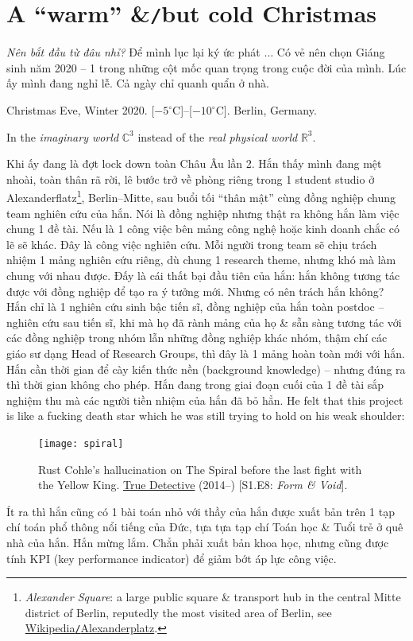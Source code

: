 \documentclass[12pt,twoside]{book}
\begin{document}
\section{A ``warm'' \&{\tt/}but cold Christmas}
{\it Nên bắt đầu từ đâu nhỉ?} Để mình lục lại ký ức phát $\ldots$ Có vẻ nên chọn Giáng sinh năm 2020 -- 1 trong những cột mốc quan trọng trong cuộc đời của mình. Lúc ấy mình đang nghỉ lễ. Cả ngày chỉ quanh quẩn ở nhà.
\begin{flushright}
	Christmas Eve, Winter 2020. [$-5^\circ$C]--[$-10^\circ$C]. Berlin, Germany.
	
	In the {\it imaginary world} $\mathbb{C}^3$ instead of the {\it real physical world} $\mathbb{R}^3$.
\end{flushright}
Khi ấy đang là đợt lock down toàn Châu Âu lần 2.
Hắn thấy mình đang mệt nhoài, toàn thân rã rời, lê bước trở về phòng riêng trong 1 student studio ở Alexanderflatz\footnote{ {\it Alexander Square}: a large public square \& transport hub in the central Mitte district of Berlin, reputedly the most visited area of Berlin, see \href{https://en.wikipedia.org/wiki/Alexanderplatz}{Wikipedia{\tt/}Alexanderplatz}.}, Berlin--Mitte, sau buổi tối ``thân mật'' cùng đồng nghiệp chung team nghiên cứu của hắn. Nói là đồng nghiệp nhưng thật ra không hắn làm việc chung 1 đề tài. Nếu là 1 công việc bên mảng công nghệ hoặc kinh doanh chắc có lẽ sẽ khác. Đây là công việc nghiên cứu. Mỗi người trong team sẽ chịu trách nhiệm 1 mảng nghiên cứu riêng, dù chung 1 research theme, nhưng khó mà làm chung với nhau được. Đấy là cái thất bại đầu tiên của hắn: hắn không tương tác được với đồng nghiệp để tạo ra ý tưởng mới. Nhưng có nên trách hắn không? Hắn chỉ là 1 nghiên cứu sinh bậc tiến sĩ, đồng nghiệp của hắn toàn postdoc -- nghiên cứu sau tiến sĩ, khi mà họ đã rành mảng của họ \& sẵn sàng tương tác với các đồng nghiệp trong nhóm lẫn những đồng nghiệp khác nhóm, thậm chí các giáo sư dạng Head of Research Groups, thì đây là 1 mảng hoàn toàn mới với hắn. Hắn cần thời gian để cày kiến thức nền (background knowledge) -- nhưng đúng ra thì thời gian không cho phép. Hắn đang trong giai đoạn cuối của 1 đề tài sắp nghiệm thu mà các người tiền nhiệm của hắn đã bỏ hẳn. He felt that this project is like a fucking death star which he was still trying to hold on his weak shoulder:
\begin{figure}[H]
	\centering
	\texttt{[image: spiral]}
	\caption{{\sf Rust Cohle}'s hallucination on The Spiral before the last fight with the {\sf Yellow King}. \href{https://www.imdb.com/title/tt2356777/}{True Detective} (2014--) [S1.E8: {\it Form \& Void}].}
\end{figure}
Ít ra thì hắn cũng có 1 bài toán nhỏ với thầy của hắn được xuất bản trên 1 tạp chí toán phổ thông nổi tiếng của Đức, tựa tựa tạp chí Toán học \& Tuổi trẻ ở quê nhà của hắn. Hắn mừng lắm. Chẳn phải xuất bản khoa học, nhưng cũng được tính KPI (key performance indicator) để giảm bớt áp lực công việc.
\end{document}
